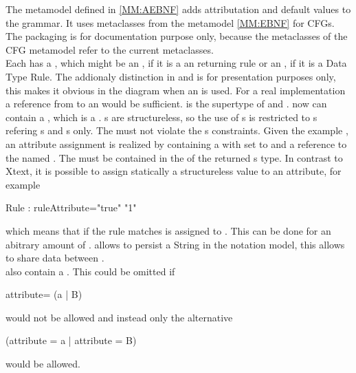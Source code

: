 The metamodel defined in \ref{MM:AEBNF} adds attributation and default values to the grammar. It uses metaclasses from the metamodel \ref{MM:EBNF} for CFGs. The packaging is for documentation purpose only, because the metaclasses of the CFG metamodel refer to the current metaclasses. \\
Each  has a , which might be an , if it is a an  returning rule or an , if it is a Data Type Rule. The addionaly distinction in  and  is for presentation purposes only, this makes it obvious in the diagram when an  is used. For a real implementation a reference from  to an  would be sufficient.  is the supertype of  and .  now can contain a  , which is a .  s are structureless, so the use of s is restricted to  s refering s and  s only. The   must not violate the  s constraints. Given the example , an attribute assignment is realized by  containing a   with  set to   and a reference to the   named . The  must be contained in the   of the returned s type. In contrast to Xtext, it is possible to assign statically a structureless value to an attribute, for example 
\begin{xtxt}
Rule : {ruleAttribute="true"} "1"
\end{xtxt}   
which means that if the rule matches  is assigned to . This can be done for an abitrary amount of .  allows to persist a String in the notation model, this allows to share data between . \\
 also contain a . This could be omitted if 
\begin{xtxt}
attribute= (a | B)
\end{xtxt}
would not be allowed and instead only the alternative 
\begin{xtxt}
(attribute = a | attribute = B)
\end{xtxt}
would be allowed.

